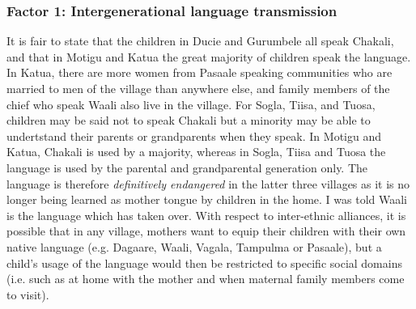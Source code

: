 \subsubsection{Factor 1: Intergenerational language transmission}
\label{sec:SOC-Factor1}

It is fair to state that the children in Ducie and Gurumbele all speak
Chakali, and that in Motigu and Katua the great majority of children  speak the
language.  In Katua,  there are more women from Pasaale
speaking communities who are married to men of the village than anywhere else,
and family members of the chief who speak Waali also live in the village. For
Sogla, Tiisa, and Tuosa, children may be said  not to speak Chakali but a
minority may be
able to undertstand their parents or grandparents when they speak.  In Motigu and Katua, Chakali is
used by a majority, whereas in
Sogla, Tiisa and Tuosa the language is used by the parental and grandparental
generation only. The language is therefore {\it definitively endangered} in the
latter
three villages as it is no longer being  learned as  mother tongue by
children in the home.  I was told  Waali is the language which has taken
over.   With respect to   inter-ethnic alliances, it is
possible that
in any village, 
mothers want to equip their children with  their own native language (e.g. 
Dagaare, Waali, Vagala, Tampulma or Pasaale), but a child's usage of the
language
would then be restricted to  specific social domains (i.e. such as at home
with the mother and when maternal family members come to visit).  



\clearpage

